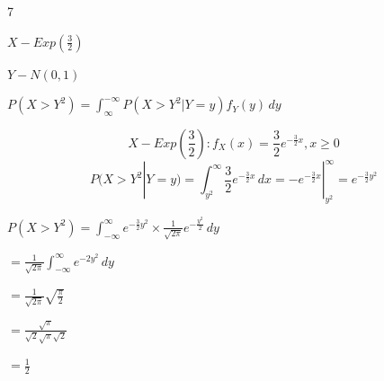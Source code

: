 \documentclass[12 pt]{article}
\begin{document}
    \begin{exercise}{7}
    \hfill

    $X - Exp(\frac{3}{2})$

    $Y - N(0,1)$

    \hfill

    $P(X > Y^2) = \int_{\infty}^{-\infty} P(X>Y^2 |Y=y) f_Y(y) \, dy$

    $$X - Exp(\frac{3}{2}): f_X(x) = \frac{3}{2} e^{-\frac{3}{2}x}, x \geq 0$$
    $$P(X>Y^2|Y=y) = \int_{y^2}^{\infty} \frac{3}{2}e^{-\frac{3}{2}x} \, dx = -e^{-\frac{3}{2}x} |_{y^2}^{\infty} = e^{-\frac{3}{2}y^2}$$

    $P(X>Y^2) = \int_{-\infty}^{\infty} e^{-\frac{3}{2}y^2} \times \frac{1}{\sqrt{2 \pi}} e^{-\frac{y^2}{2}} \, dy$

    $= \frac{1}{\sqrt{2 \pi}} \int_{-\infty}^{\infty} e^{-2y^2} \, dy$

    $= \frac{1}{\sqrt{2 \pi}}\sqrt{\frac{\pi}{2}}$

    $= \frac{\sqrt{\pi}}{\sqrt{2}\sqrt{\pi}\sqrt{2}}$

    $= \frac{1}{2}$

    \hfill
    \end{exercise}
\end{document}
